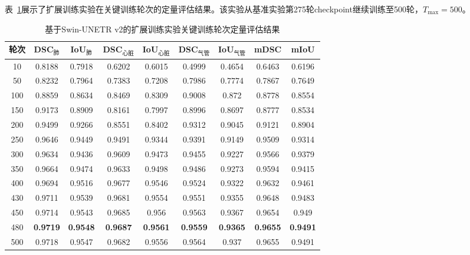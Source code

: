 \documentclass[12pt, a4paper]{article}
\begin{document}
表~\ref{tab:results_exp4}展示了扩展训练实验在关键训练轮次的定量评估结果。该实验从基准实验第275轮checkpoint继续训练至500轮，$T_{\max}=500$。

\begin{table}[H]
    \centering
    \caption{基于Swin-UNETR v2的扩展训练实验关键训练轮次定量评估结果}
    \label{tab:results_exp4}
    \small
    \begin{adjustbox}{max width=\textwidth}
    \begin{tabular}{@{}ccccccccc@{}}
        \toprule
        \textbf{轮次} & \textbf{DSC$_\text{肺}$} & \textbf{IoU$_\text{肺}$} & \textbf{DSC$_\text{心脏}$} & \textbf{IoU$_\text{心脏}$} & \textbf{DSC$_\text{气管}$} & \textbf{IoU$_\text{气管}$} & \textbf{mDSC} & \textbf{mIoU} \\
        \midrule
        10 & 0.8188 & 0.7918 & 0.6202 & 0.6015 & 0.4999 & 0.4654 & 0.6463 & 0.6196 \\
        50 & 0.8232 & 0.7964 & 0.7383 & 0.7208 & 0.7986 & 0.7774 & 0.7867 & 0.7649 \\
        100 & 0.8859 & 0.8634 & 0.8469 & 0.8309 & 0.9008 & 0.872 & 0.8778 & 0.8554 \\
        150 & 0.9173 & 0.8909 & 0.8161 & 0.7997 & 0.8996 & 0.8697 & 0.8777 & 0.8534 \\
        200 & 0.9499 & 0.9266 & 0.8551 & 0.8402 & 0.9312 & 0.9045 & 0.9121 & 0.8904 \\
        250 & 0.9646 & 0.9449 & 0.9491 & 0.9344 & 0.9391 & 0.9149 & 0.9509 & 0.9314 \\
        300 & 0.9634 & 0.9436 & 0.9609 & 0.9473 & 0.9455 & 0.9227 & 0.9566 & 0.9379 \\
        350 & 0.9664 & 0.9474 & 0.9633 & 0.9498 & 0.9486 & 0.9273 & 0.9594 & 0.9415 \\
        400 & 0.9694 & 0.9516 & 0.9677 & 0.9546 & 0.9524 & 0.9322 & 0.9632 & 0.9461 \\
        430 & 0.9711 & 0.9539 & 0.9681 & 0.9554 & 0.9551 & 0.9355 & 0.9648 & 0.9483 \\
        450 & 0.9714 & 0.9543 & 0.9685 & 0.956 & 0.9563 & 0.9367 & 0.9654 & 0.949 \\
        480 & \textbf{0.9719} & \textbf{0.9548} & \textbf{0.9687} & \textbf{0.9561} & \textbf{0.9559} & \textbf{0.9365} & \textbf{0.9655} & \textbf{0.9491} \\
        500 & 0.9718 & 0.9547 & 0.9682 & 0.9556 & 0.9564 & 0.937 & 0.9655 & 0.9491 \\
        \bottomrule
    \end{tabular}
    \end{adjustbox}
\end{table}
\end{document}
